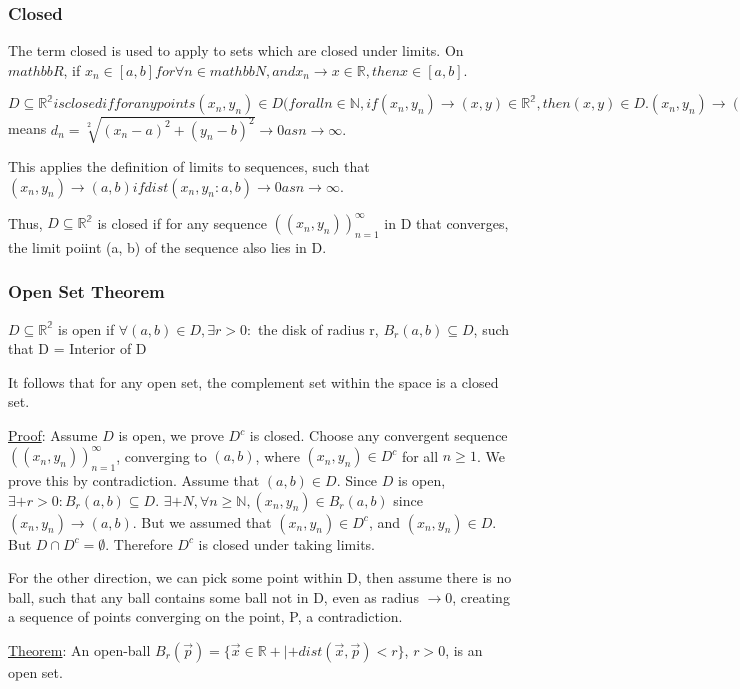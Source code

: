 \documentclass[11 pt, twoside]{article}
\begin{document}
\subsubsection{Closed}
The term closed is used to apply to sets which are closed under limits. On $mathbb{R}$, if $x_n \in [a, b] for \forall n \in mathbb{N}, and x_n \to x \in \mathbb{R}, then x \in [a, b]$.

$D \subseteq \mathbb{R^2} is closed if for any points (x_n, y_n) \in D (for all n \in \mathbb{N}, if (x_n, y_n) \to (x, y) \in \mathbb{R^2}, then (x, y) \in D. (x_n, y_n) \to (a, b) as n \to \infty$ means $d_n = \sqrt[2]{(x_n - a)^2 + (y_n - b)^2} \to 0 as n \to \infty.$

This applies the definition of limits to sequences, such that $(x_n, y_n) \to (a, b) if dist(x_n, y_n: a, b) \to 0 as n \to \infty$.

Thus, $D \subseteq \mathbb{R^2}$ is closed if for any sequence $((x_n, y_n))^\infty_{n=1}$ in D that converges, the limit poiint (a, b) of the sequence also lies in D.

\subsubsection{Open Set Theorem}
$D \subseteq \mathbb{R^2}$ is open if $\forall (a, b) \in D, \exists r > 0:$ the disk of radius r, $B_r(a, b) \subseteq D$, such that D = Interior of D

It follows that for any open set, the complement set within the space is a closed set.

\underline{Proof}:
Assume $D$ is open, we prove $D^c$ is closed. Choose any convergent sequence
$((x_n, y_n))_{n = 1}^\infty$, converging to $(a, b)$, where $(x_n, y_n) \in
D^c$ for all $n \geq 1$.
We prove this by contradiction. Assume that $(a, b) \in D$. Since $D$ is open,
$\exists+ r > 0:B_r(a, b)\subseteq D$. $\exists+ N, \forall n \geq
\mathbb{N}, (x_n, y_n) \in B_r(a, b)$ since $(x_n, y_n)\to(a,b)$. But we
assumed that $(x_n, y_n) \in D^c$, and $(x_n, y_n) \in D$. But $D \cap D^c =
\emptyset$. Therefore $D^c$ is closed under taking limits.

For the other direction, we can pick some point within D, then assume there is no ball, such that any ball contains some ball not in D, even as radius $\to 0$, creating a sequence of points converging on the point, P, a contradiction.

\underline{Theorem}: An open-ball $B_r(\vec{p}) = \{\vec{x} \in \mathbb{R} +|+
dist(\vec{x}, \vec{p}) < r\}$, $r > 0$, is an open set.
\end{document}
